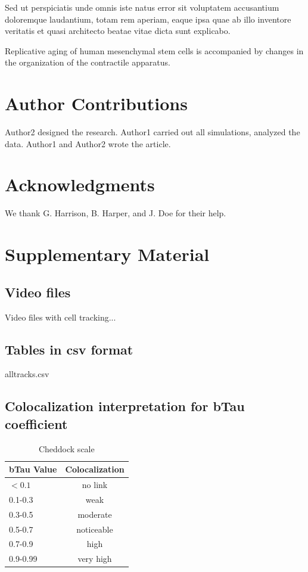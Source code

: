 \documentclass[english,authoryear]{elsarticle}
\begin{document}
Sed ut perspiciatis unde omnis iste natus error sit voluptatem accusantium doloremque laudantium, totam rem aperiam, eaque ipsa quae ab illo inventore veritatis et quasi architecto beatae vitae dicta sunt explicabo.

Replicative aging of human mesenchymal stem cells is accompanied by changes in the organization of the contractile apparatus.

\section*{Author Contributions}

Author2 designed the research. Author1 carried out all simulations, analyzed the data. Author1 and Author2 wrote the article.

\section*{Acknowledgments}

We thank G. Harrison, B. Harper, and J. Doe for their help.

%
%
%


\section*{Supplementary Material}

\subsection*{Video files}

Video files with cell tracking...

\subsection*{Tables in csv format}

alltracks.csv

\subsection*{Colocalization interpretation for bTau coefficient}

\begin{table}[h]
  \caption{Cheddock scale}
  \label{cheddock}
\centering
\begin{tabular}{l|c|}
  bTau Value & Colocalization \\
 \hline
 $ <0.1 $ & no link \\
 0.1-0.3 & weak \\
 0.3-0.5 & moderate \\
 0.5-0.7 & noticeable \\
 0.7-0.9 & high \\
 0.9-0.99 & very high
\end{tabular}
\end{table}
\end{document}
